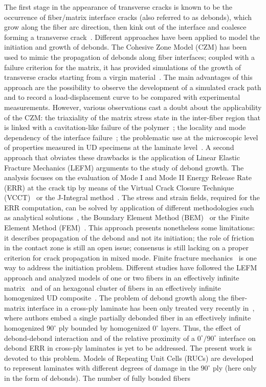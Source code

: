 \documentclass[review]{elsarticle}
\begin{document}
The first stage in the appearance of transverse cracks is known to be the occurrence of fiber/matrix interface cracks (also referred to as debonds), which grow along the fiber arc direction, then kink out of the interface and coalesce forming a transverse crack~\cite{Bailey1981}. Different approaches have been applied to model the initiation and growth of debonds. The Cohesive Zone Model (CZM) has been used to mimic the propagation of debonds along fiber interfaces; coupled with a failure criterion for the matrix, it has provided simulations of the growth of transverse cracks starting from a virgin material~\cite{Kushch2011,Canal2012,Bouhala2013,Herraez2015}. The main advantages of this approach are the possibility to observe the development of a simulated crack path and to record a load-displacement curve to be compared with experimental measurements. However, various observations cast a doubt about the applicability of the CZM: the triaxiality of the matrix stress state in the inter-fiber region that is linked with a cavitation-like failure of the polymer~\cite{Asp1995}; the locality and mode dependency of the interface failure~\cite{Mantic2009}; the problematic use at the microscopic level of properties measured in UD specimens at the laminate level~\cite{Canal2012}. A second approach that obviates these drawbacks is the application of Linear Elastic Fracture Mechanics (LEFM) arguments to the study of debond growth. The analysis focuses on the evaluation of Mode I and Mode II Energy Release Rate (ERR) at the crack tip by means of the Virtual Crack Closure Technique (VCCT)~\cite{Krueger2004} or the J-Integral method~\cite{Rice1968}. The stress and strain fields, required for the ERR computation, can be solved by application of different methodologies such as analytical solutions~\cite{Toya1974}, the Boundary Element Method (BEM)~\cite{Paris1996} or the Finite Element Method (FEM)~\cite{Zhuang2018}. This approach presents nonetheless some limitations: it describes propagation of the debond and not its initiation; the role of friction in the contact zone is still an open issue; consensus is still lacking on a proper criterion for crack propagation in mixed mode. Finite fracture mechanics~\cite{MunozReja2016} is one way to address the initiation problem. Different studies have followed the LEFM approach and analyzed models of one or two fibers in an effectively infinite matrix~\cite{Correa2011,Correa2013,Correa2014,Sandino2016,Sandino2018} and of an hexagonal cluster of fibers in an effectively infinite homogenized UD composite~\cite{Varna2017,Zhuang2018}. The problem of debond growth along the fiber-matrix interface in a cross-ply laminate has been only treated very recently in~\cite{Velasco2018,Paris2018}, where authors embed a single partially debonded fiber in an effectively infinite homogenized $90^{\circ}$ ply bounded by homogenized $0^{\circ}$ layers. Thus, the effect of debond-debond interaction and of the relative proximity of a $0^{\circ}/90^{\circ}$ interface on debond ERR in cross-ply laminates is yet to be addressed. The present work is devoted to this problem. Models of Repeating Unit Cells (RUCs) are developed to represent laminates with different degrees of damage in the $90^{\circ}$ ply (here only in the form of debonds). The number of fully bonded fibers 
\end{document}
